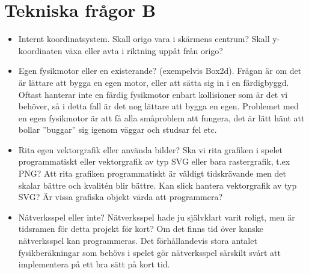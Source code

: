 \documentclass[a4paper,11pt]{article}
\begin{document}
\section{Tekniska frågor B}
\begin{itemize}
\item Internt koordinatsystem. Skall origo vara i skärmens centrum?
Skall y-koordinaten växa eller avta i riktning uppåt från origo?

\item Egen fysikmotor eller en existerande? (exempelvis Box2d). 
\noindent Frågan är om det är lättare att bygga en egen motor,
eller att sätta sig in i en färdigbyggd. Oftast hanterar inte en färdig fysikmotor enbart kollisioner som 
är det vi behöver, så i detta fall är det nog lättare att bygga en egen. Problemet med en egen fysikmotor är
att få alla småproblem att fungera, det är lätt hänt att bollar ''buggar'' sig igenom väggar och studsar fel etc.

\item Rita egen vektorgrafik eller använda bilder?
\noindent Ska vi rita grafiken i spelet programmatiskt eller vektorgrafik av typ SVG eller bara rastergrafik, t.ex PNG? 
Att rita grafiken programmatiskt är väldigt tidskrävande men det skalar bättre och kvalitén blir bättre.
Kan slick hantera vektorgrafik av typ SVG? Är vissa grafiska objekt värda att programmera? 

\item Nätverksspel eller inte?
\noindent Nätverksspel hade ju självklart varit roligt, men är tidsramen för detta projekt för kort?
Om det finns tid över kanske nätverksspel kan programmeras. Det förhållandevis stora antalet
fysikberäkningar som behövs i spelet gör nätverksspel särskilt svårt att implementera
på ett bra sätt på kort tid.
\end{itemize}

\newpage
\end{document}
